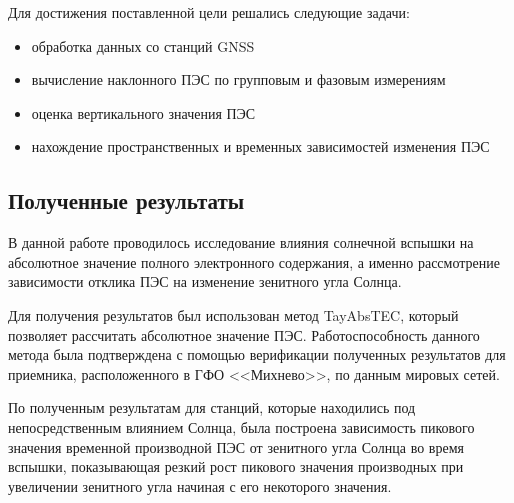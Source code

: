 \documentclass[a4paper]{article}
\begin{document}
Для достижения поставленной цели решались следующие задачи:
\begin{itemize}
\item обработка данных со станций GNSS
\item вычисление наклонного ПЭС по групповым и фазовым измерениям
\item оценка вертикального значения ПЭС
\item нахождение пространственных и временных зависимостей изменения ПЭС
\end{itemize}

\subsection*{Полученные результаты}

В данной работе проводилось исследование влияния солнечной вспышки на абсолютное значение полного электронного содержания, а именно рассмотрение зависимости отклика ПЭС на изменение зенитного угла Солнца. 

Для получения результатов был использован метод TayAbsTEC, который позволяет рассчитать абсолютное значение ПЭС. Работоспособность данного метода была подтверждена с помощью верификации полученных результатов для приемника, расположенного в ГФО <<Михнево>>, по данным мировых сетей. 

По полученным результатам для станций, которые находились под непосредственным влиянием Солнца, была построена зависимость пикового значения временной производной ПЭС от зенитного угла Солнца во время вспышки, показывающая резкий рост пикового значения производных при увеличении зенитного угла начиная с его некоторого значения.
\end{document}
